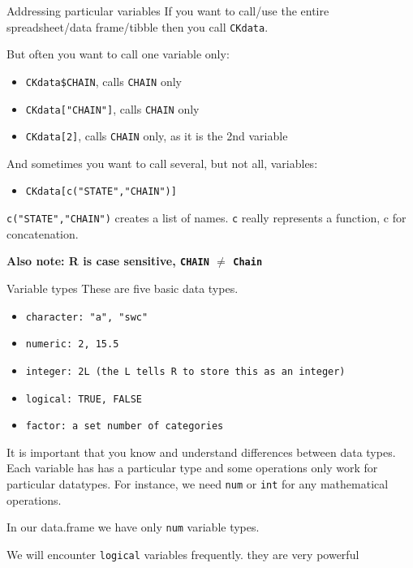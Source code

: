 \documentclass[
  ignorenonframetext,
]{beamer}
\providecommand{\tightlist}{%
  \setlength{\itemsep}{0pt}\setlength{\parskip}{0pt}}
\begin{document}
\begin{frame}{Addressing particular variables}
\label{addressing-particular-variables}
If you want to call/use the entire spreadsheet/data frame/tibble then
you call \texttt{CKdata}.

But often you want to call one variable only:

\begin{itemize}
\tightlist
\item
  \texttt{CKdata\$CHAIN}, calls \texttt{CHAIN} only
\item
  \texttt{CKdata["CHAIN"]}, calls \texttt{CHAIN} only
\item
  \texttt{CKdata[2]}, calls \texttt{CHAIN} only, as it is the 2nd
  variable
\end{itemize}

And sometimes you want to call several, but not all, variables:

\begin{itemize}
\tightlist
\item
  \texttt{CKdata[c("STATE","CHAIN")]}
\end{itemize}

\texttt{c("STATE","CHAIN")} creates a list of names. \texttt{c} really
represents a function, c for concatenation.

\textbf{Also note: R is case sensitive, \texttt{CHAIN} $\neq$ \texttt{Chain}}
\end{frame}

\begin{frame}{Variable types}
\label{variable-types}
These are five basic data types.

\begin{itemize}
  \item \texttt{character: "a", "swc"}
  \item \texttt{numeric: 2, 15.5}
  \item \texttt{integer: 2L (the L tells R to store this as an integer)}
  \item \texttt{logical: TRUE, FALSE}
  \item \texttt{factor: a set number of categories}
\end{itemize}

It is important that you know and understand differences between data
types. Each variable has has a particular type and some operations only
work for particular datatypes. For instance, we need \texttt{num} or
\texttt{int} for any mathematical operations.

In our data.frame we have only \texttt{num} variable types.

We will encounter \texttt{logical} variables frequently.
\textcolor{student}{they are very powerful}
\end{frame}
\end{document}
